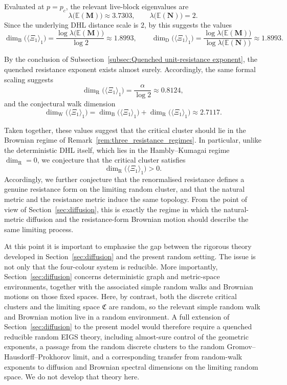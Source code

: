 \documentclass{article}
\theoremstyle{plain}
\theoremstyle{definition}
\newcommand{\dimbox}{\dim_\mathrm{B}}
\newcommand{\dimdeg}{\dim_\mathrm{D}}
\newcommand{\dimwalk}{\dim_\mathrm{W}}
\newcommand{\dimresis}{\dim_\mathrm{R}}
\begin{document}
Evaluated at $p=p_c$, the relevant live-block eigenvalues are
\[
\lambda\bigl(\mathbb E(\mathbf M)\bigr)\approx 3.7303,
\qquad
\lambda\bigl(\mathbb E(\mathbf N)\bigr)=2.
\]
Since the underlying DHL distance scale is $2$, by \cite{li2024on,neroli2024fractal,li2025reducible} this suggests the  values
\[
\dimbox\big(\langle \Xi_1\rangle_1\big)
=
\frac{\log \lambda\bigl(\mathbb E(\mathbf M)\bigr)}{\log 2}
\approx 1.8993,
\qquad
\dimdeg\big(\langle \Xi_1\rangle_1\big)
=
\frac{\log \lambda\bigl(\mathbb E(\mathbf M)\bigr)}{\log \lambda\bigl(\mathbb E(\mathbf N)\bigr)}
\approx 1.8993.
\]

By the conclusion of Subsection~\ref{subsec:Quenched unit-resistance exponent}, the quenched resistance exponent exists almost surely.
Accordingly, the same formal scaling suggests
\[
\dimresis\big(\langle \Xi_1\rangle_1\big)
=
\frac{\alpha}{\log 2}
\approx 0.8124,
\]
and the conjectural walk dimension
\[
\dimwalk\big(\langle \Xi_1\rangle_1\big)
=
\dimbox\big(\langle \Xi_1\rangle_1\big)+\dimresis\big(\langle \Xi_1\rangle_1\big)
\approx 2.7117.
\]

Taken together, these values suggest that the critical cluster should lie in the Brownian regime of Remark~\ref{rem:three_resistance_regimes}.
In particular, unlike the deterministic DHL itself, which lies in the Hambly--Kumagai regime $\dimresis=0$, we conjecture that the critical cluster satisfies
\[
\dimresis\big(\langle \Xi_1\rangle_1\big)>0.
\]
Accordingly, we further conjecture that the renormalised resistance defines a genuine resistance form on the limiting random cluster, and that the natural metric and the resistance metric induce the same topology.
From the point of view of Section~\ref{sec:diffusion}, this is exactly the regime in which the natural-metric diffusion and the resistance-form Brownian motion should describe the same limiting process.

At this point it is important to emphasise the gap between the rigorous theory developed in Section~\ref{sec:diffusion} and the present random setting.
The issue is not only that the four-colour system is reducible.
More importantly, Section~\ref{sec:diffusion} concerns deterministic graph and metric-space environments, together with the associated simple random walks and Brownian motions on those fixed spaces.
Here, by contrast, both the discrete critical clusters and the limiting space $\mathfrak C$ are random, so the relevant simple random walk and Brownian motion live in a random environment.
A full extension of Section~\ref{sec:diffusion} to the present model would therefore require a quenched reducible random EIGS theory, including almost-sure control of the geometric exponents, a passage from the random discrete clusters to the random Gromov--Hausdorff--Prokhorov limit, and a corresponding transfer from random-walk exponents to diffusion and Brownian spectral dimensions on the limiting random space.
We do not develop that theory here.
\end{document}
